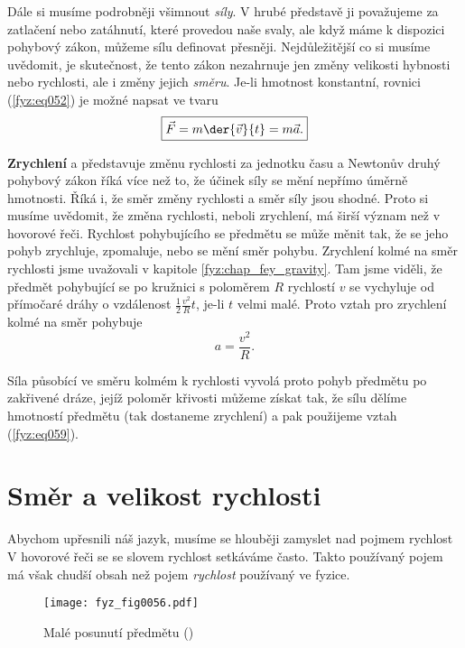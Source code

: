     Dále si musíme podrobněji všimnout \emph{síly}. V hrubé představě ji považujeme za zatlačení 
    nebo zatáhnutí, které provedou naše svaly, ale když máme k dispozici pohybový zákon, můžeme 
    sílu definovat přesněji. Nejdůležitější co si musíme uvědomit, je skutečnost, že tento zákon 
    nezahrnuje jen změny velikosti hybnosti nebo rychlosti, ale i změny jejich \emph{směru}. Je-li 
    hmotnost konstantní, rovnici (\ref{fyz:eq052}) je možné napsat ve tvaru
    \begin{equation}\label{fyz:eq053}
      \boxed{
        \vec{F} = m\der{\vec{v}}{t} = m\vec{a}.
       }
    \end{equation}
    
    \textbf{Zrychlení} a představuje změnu rychlosti za jednotku času a Newtonův druhý pohybový 
    zákon říká více než to, že účinek síly se mění nepřímo úměrně hmotnosti. Říká i, že směr změny 
    rychlosti a směr síly jsou shodné. Proto si musíme uvědomit, že změna rychlosti, neboli 
    zrychlení, má širší význam než v hovorové řeči. Rychlost pohybujícího se předmětu se může měnit 
    tak, že se jeho pohyb zrychluje, zpomaluje, nebo se mění směr pohybu. Zrychlení kolmé na směr 
    rychlosti jsme uvažovali v kapitole \ref{fyz:chap_fey_gravity}. Tam jsme viděli, že předmět 
    pohybující se po kružnici s poloměrem \(R\) rychlostí \(v\) se vychyluje od přímočaré dráhy o 
    vzdálenost \(\frac{1}{2}\frac{v^2}{R}t\), je-li \(t\) velmi malé. Proto vztah pro zrychlení 
    kolmé na směr pohybuje
    \begin{equation}\label{fyz:eq059}
      a = \frac{v^2}{R}.
    \end{equation}
    
    Síla působící ve směru kolmém k rychlosti vyvolá proto pohyb předmětu po zakřivené dráze, jejíž 
    poloměr křivosti můžeme získat tak, že sílu dělíme hmotností předmětu (tak dostaneme zrychlení) 
    a pak použijeme vztah (\ref{fyz:eq059}).
    
  \section{Směr a velikost rychlosti}\label{fyz:IchapIXsecII}
    Abychom upřesnili náš jazyk, musíme se hlouběji zamyslet nad pojmem rychlost V hovorové řeči se 
    se slovem rychlost setkáváme často. Takto používaný pojem má však chudší obsah než pojem 
    \emph{rychlost} používaný ve fyzice.

    \begin{figure}[ht!]  %
      \centering
      \texttt{[image: fyz\_fig0056.pdf]}
      \caption{Malé posunutí předmětu (\cite[s.~124]{Feynman01})}
      \label{fyz:fig0056}
    \end{figure}
    
